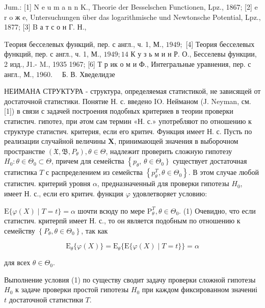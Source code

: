 \documentclass[10pt]{article}
\begin{document}
Jum.: [1] N e u m a n n K., Theorie der Besselschen Functionen, Lpz., 1867; [2] e r o ж e, Untersuchungen über das logarithmische und Newtonsche Potential, Lpz., 1877; [3] B а т с о н Г. Н.,

Tеория бесселевых функций, пер. с англ., ч. 1, М., $1949 ;$ [4] Теория бесселевых функций, пер. с англ., ч. 1, М., $1949 ; 14$ К у з ь м и н Р. О., Бесселевы функции, 2 изд., Ј1.- M., 1935 1967; [6] Т р ик о м и Ф., Интегральные уравнения, пер. с англ., М., $1960 . \quad$ Б. В. Хведелидзе



НЕИМАНА СТРУКТУРА - структура, определяемая статистикой, не зависящей от достаточной статистики. Понятие Н. с. введено IO. Нейманом (J. Neyman, см. [1]) в связи с задачей построения подобных критериев в теории проверки статистич. гипотез, при әтом сам термин «Н. с.» употребляют по отношению к структуре статистич. критерия, если его критич. Функция имеет Н. с. Пусть по реализации случайной величины $\boldsymbol{X}$, принимающей значения в выборочном пространстве $\left(\mathfrak{X}, \mathfrak{B}, P_{\theta}\right), \theta \in \Theta$, надлежит проверить сложную гипотезу $H_{0}: \theta \in \Theta_{0} \subset \Theta$, причем для семейства $\left\{p_{\theta}\right.$, $\left.\theta \in \Theta_{0}\right\}$ существует достаточная статистика $T$ с распределением из семейства $\left\{p_{\theta}^{T}, \theta \in \Theta_{0}\right\}$. В этом случае любой статистич. критерий уровня $\alpha$, предназначенный для проверки гипотезы $H_{0}$, имеет Н. с., если его критич. функция $\varphi$ удовлетворяет условию:



$\mathrm{E}\{\varphi(X) \mid T=t\}=\alpha$ шочти всюду по мере $\mathrm{P}_{\theta}^{T}, \theta \in \Theta_{0}$. (1) Очевидно, что если статистич. критерпй имеет Н. с., то он является подобным по отношению к семейству $\left\{P_{\theta}, \theta \in \Theta_{0}\right\}$, так как



\[

\mathrm{E}_{\theta}\{\varphi(X)\}=\mathrm{E}_{\theta}\{\mathrm{E}\{\varphi(X) \mid T=t\}\}=\alpha

\]



для всех $\theta \in \Theta_{0}$.



Выполнение условия (1) по существу сводит задачу проверки сложной гипотезы $H_{0}$ к задаче проверки простой гипотезы $H_{0}$ при каждом фиксированном значениі $t$ достаточной статистики $T$.
\end{document}
